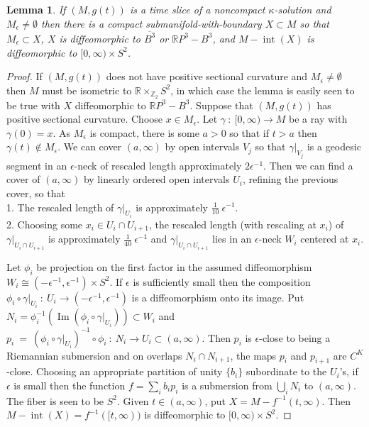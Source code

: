 \documentclass[12pt]{amsart}
\newcommand{\Image}{\operatorname{Im}}
\newcommand{\Int}{\operatorname{int}}
\newcommand{\R}{{\mathbb R}}
\newcommand{\Z}{{\mathbb Z}}
\numberwithin{equation}{section}
\theoremstyle{plain}
\newtheorem{lemma}[equation]{Lemma}
\theoremstyle{definition}
\theoremstyle{remark}
\begin{document}
\begin{lemma} \label{noncompactsoliton}
If $(M, g(t))$ is a time slice of a
noncompact $\kappa$-solution and
$M_\epsilon \neq \emptyset$ then there is a compact
submanifold-with-boundary $X \subset M$ so that
$M_\epsilon \subset X$,  $X$ is diffeomorphic to $\overline{B^3}$ or
$\R P^3 - B^3$, and $M- \Int(X)$ is
diffeomorphic to $[0, \infty) \times S^2$.
\end{lemma}
\begin{proof}
If $(M,g(t))$ does not have positive sectional curvature and
$M_\epsilon \neq \emptyset$ then $M$ must be isometric to
$\R \times_{\Z_2} S^2$, in which case the lemma is easily seen to
be true with $X$ diffeomorphic to $\R P^3 - B^3$. 
Suppose that $(M, g(t))$ has positive sectional curvature.
Choose $x \in M_\epsilon$. Let $\gamma \: : \: [0, \infty) 
\rightarrow M$ be a ray with $\gamma(0) = x$. As $M_\epsilon$ is 
compact, there is some $a > 0$ so that if $t > a$ then
$\gamma(t) \notin M_\epsilon$. 
We can cover $(a, \infty)$ by open
intervals $V_j$ so that $\gamma \Big|_{V_j}$ is a geodesic segment
in an $\epsilon$-neck of 
rescaled length approximately
$2 \epsilon^{-1}$.  
Then we can find a cover of $(a, \infty)$ by 
linearly ordered open intervals
$U_i$, refining the previous cover, so that \\
1. The rescaled length of $\gamma \Big|_{U_i}$ is approximately
$\frac{1}{10} \: \epsilon^{-1}$. \\
2. Choosing some $x_i \in U_i \cap U_{i+1}$, the
rescaled length (with rescaling at $x_i$) of
$\gamma \Big|_{U_i \cap U_{i+1}}$ is approximately
$\frac{1}{40} \: \epsilon^{-1}$ and 
$\gamma \Big|_{U_i \cap U_{i+1}}$ lies in an $\epsilon$-neck $W_i$
centered at $x_i$.

Let $\phi_i$
be projection on the first factor in the assumed diffeomorphism
$W_i \cong  (- \epsilon^{-1}, \epsilon^{-1}) \times S^2$.
If $\epsilon$ is sufficiently small then
the composition $\phi_i \circ \gamma \big|_{U_i}  \: : \: U_i \rightarrow
(- \epsilon^{-1}, \epsilon^{-1})$ is a diffeomorphism onto its image.
Put $N_i = \phi_i^{-1}(\Image(\phi_i \circ \gamma \big|_{U_i})) \subset
W_i$ and
$p_i \: = \: (\phi_i \circ \gamma \big|_{U_i})^{-1} \circ \phi_i \: : \:
N_i \rightarrow U_i \subset (a, \infty)$. Then $p_i$ is $\epsilon$-close
to being a Riemannian submersion and
on overlaps $N_i \cap N_{i+1}$, the maps $p_i$ and $p_{i+1}$ are
$C^K$-close. Choosing an appropriate
partition of unity $\{b_i\}$ subordinate to the $U_i$'s, if $\epsilon$ is
small then the function
$f = \sum_i b_i p_i$ is a submersion from $\bigcup_i N_i$ to 
$(a, \infty)$. The fiber is seen to be $S^2$. Given $t \in (a, \infty)$,
put $X = M - f^{-1}(t, \infty)$. Then $M - \Int(X) = f^{-1}([t, \infty))$ 
is diffeomorphic to $[0, \infty) \times S^2$. 


\end{proof}
\end{document}

